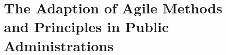 \documentclass[a4paper]{article}
\begin{document}
\rhead{\today}

\textsl{}

\section*{The Adaption of Agile Methods and Principles in Public Administrations}
\begin{center}
\end{center}

\noindent
\begin{spacing}{1.5}


\end{spacing}
\end{document}
